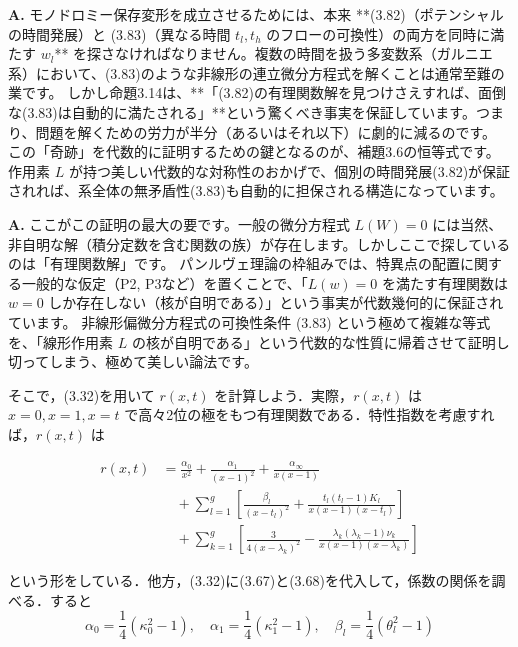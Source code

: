 \begin{Q}
\textbf{A.} モノドロミー保存変形を成立させるためには、本来 **(3.82)（ポテンシャルの時間発展）と (3.83)（異なる時間 $t_l, t_h$ のフローの可換性）の両方を同時に満たす $w_l$** を探さなければなりません。複数の時間を扱う多変数系（ガルニエ系）において、(3.83)のような非線形の連立微分方程式を解くことは通常至難の業です。
しかし命題3.14は、**「(3.82)の有理関数解を見つけさえすれば、面倒な(3.83)は自動的に満たされる」**という驚くべき事実を保証しています。つまり、問題を解くための労力が半分（あるいはそれ以下）に劇的に減るのです。
この「奇跡」を代数的に証明するための鍵となるのが、補題3.6の恒等式です。作用素 $L$ が持つ美しい代数的な対称性のおかげで、個別の時間発展(3.82)が保証されれば、系全体の無矛盾性(3.83)も自動的に担保される構造になっています。
\end{Q}

\begin{Q}[【核心】作用素 $L$ で括った中身が $=0$ になるのはなぜか？積分定数のようなものは出ないのか？]
\textbf{A.} ここがこの証明の最大の要です。一般の微分方程式 $L(W) = 0$ には当然、非自明な解（積分定数を含む関数の族）が存在します。しかしここで探しているのは「有理関数解」です。
パンルヴェ理論の枠組みでは、特異点の配置に関する一般的な仮定（P2, P3など）を置くことで、「$L(w)=0$ を満たす有理関数は $w=0$ しか存在しない（核が自明である）」という事実が代数幾何的に保証されています。
非線形偏微分方程式の可換性条件 (3.83) という極めて複雑な等式を、「線形作用素 $L$ の核が自明である」という代数的な性質に帰着させて証明し切ってしまう、極めて美しい論法です。
\end{Q}

\begin{story}
そこで，(3.32)を用いて $r(x,t)$ を計算しよう．実際，$r(x,t)$ は $x=0, x=1, x=t$ で高々2位の極をもつ有理関数である．特性指数を考慮すれば，$r(x,t)$ は

\begin{align}
    r(x,t) &= \frac{\alpha_0}{x^2} + \frac{\alpha_1}{(x-1)^2} + \frac{\alpha_\infty}{x(x-1)} \nonumber \\
    &\quad + \sum_{l=1}^g \left[ \frac{\beta_l}{(x-t_l)^2} + \frac{t_l(t_l-1)K_l}{x(x-1)(x-t_l)} \right] \label{eq:3.85} \\
    &\quad + \sum_{k=1}^g \left[ \frac{3}{4(x-\lambda_k)^2} - \frac{\lambda_k(\lambda_k-1)\nu_k}{x(x-1)(x-\lambda_k)} \right] \nonumber
\end{align}

という形をしている．他方，(3.32)に(3.67)と(3.68)を代入して，係数の関係を調べる．すると
\begin{equation*}
    \alpha_0 = \frac{1}{4}(\kappa_0^2 - 1), \quad \alpha_1 = \frac{1}{4}(\kappa_1^2 - 1), \quad \beta_l = \frac{1}{4}(\theta_l^2 - 1)
\end{equation*}
\end{story}

